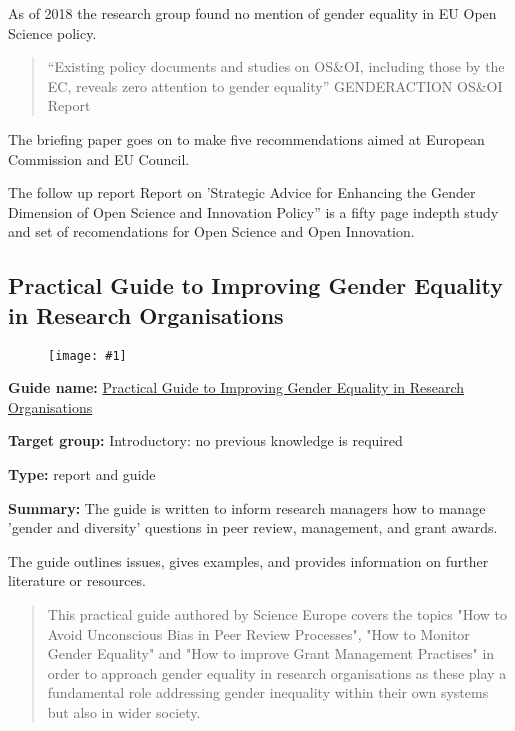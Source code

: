 \documentclass{article}
\newlength{\imgwidth}
\newcommand\scaledgraphics[2]{%
                
\settowidth{\imgwidth}{\texttt{[image: \#1]}}%
                
\setlength{\imgwidth}{\minof{\imgwidth}{#2\textwidth}}%
                
\texttt{[image: \#1]}%
                
}
\begin{document}
As of 2018 the research group found no mention of gender equality in EU Open Science policy.

\begin{quote}



“Existing policy documents and studies on OS\&OI, including those by the EC, reveals zero attention to gender equality” GENDERACTION OS\&OI Report


\end{quote}


The briefing paper goes on to make five recommendations aimed at European Commission and EU Council.


The follow up report Report on 'Strategic Advice for Enhancing the Gender Dimension of Open Science and Innovation Policy'' is a fifty page indepth study and set of recomendations for Open Science and Open Innovation.


\subsection{Practical Guide to Improving Gender Equality in Research Organisations}\label{H2478521}



\begin{center}
\begin{figure}
\scaledgraphics{2d74c16d-6a0e-48c6-a149-1074544f4a51.jpg}{0.5}
\label{F3238931}
\end{figure}


\end{center}


\textbf{Guide name:} \href{https://www.fosteropenscience.eu/content/practical-guide-improving-gender-equality-research-organisations}{Practical Guide to Improving Gender Equality in Research Organisations}\textbf{ }\autocite{science_europe_practical_nodate}


\textbf{Target group: }Introductory: no previous knowledge is required


\textbf{Type: }report and guide


\textbf{Summary: }The guide is written to inform research managers how to manage 'gender and diversity' questions in peer review, management, and grant awards.


The guide outlines issues, gives examples, and provides information on further literature or resources.

\begin{quote}



This practical guide authored by Science Europe covers the topics "How to Avoid Unconscious Bias in Peer Review Processes", "How to Monitor Gender Equality" and "How to improve Grant Management Practises" in order to approach gender equality in research organisations as these play a fundamental role addressing gender inequality within their own systems but also in wider society.


\end{quote}


\printbibliography[title={Bibliography}]
\end{document}
